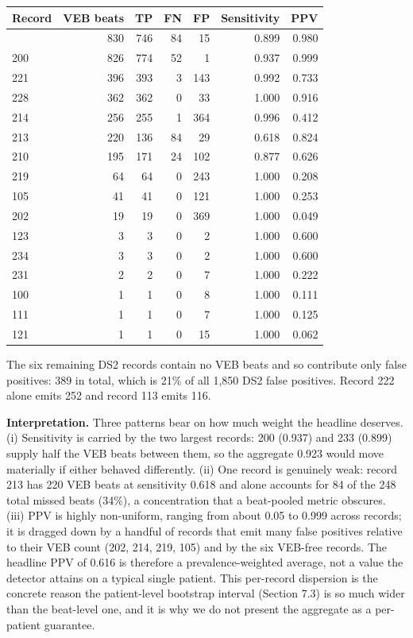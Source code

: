 \documentclass[
]{article}
\begin{document}
\begin{longtable}[]{@{}lrrrrrr@{}}
\toprule\noalign{}
Record & VEB beats & TP & FN & FP & Sensitivity & PPV \\
\midrule\noalign{}
\endhead
\bottomrule\noalign{}
\endlastfoot
233 & 830 & 746 & 84 & 15 & 0.899 & 0.980 \\
200 & 826 & 774 & 52 & 1 & 0.937 & 0.999 \\
221 & 396 & 393 & 3 & 143 & 0.992 & 0.733 \\
228 & 362 & 362 & 0 & 33 & 1.000 & 0.916 \\
214 & 256 & 255 & 1 & 364 & 0.996 & 0.412 \\
213 & 220 & 136 & 84 & 29 & 0.618 & 0.824 \\
210 & 195 & 171 & 24 & 102 & 0.877 & 0.626 \\
219 & 64 & 64 & 0 & 243 & 1.000 & 0.208 \\
105 & 41 & 41 & 0 & 121 & 1.000 & 0.253 \\
202 & 19 & 19 & 0 & 369 & 1.000 & 0.049 \\
123 & 3 & 3 & 0 & 2 & 1.000 & 0.600 \\
234 & 3 & 3 & 0 & 2 & 1.000 & 0.600 \\
231 & 2 & 2 & 0 & 7 & 1.000 & 0.222 \\
100 & 1 & 1 & 0 & 8 & 1.000 & 0.111 \\
111 & 1 & 1 & 0 & 7 & 1.000 & 0.125 \\
121 & 1 & 1 & 0 & 15 & 1.000 & 0.062 \\
\end{longtable}

The six remaining DS2 records contain no VEB beats and so contribute
only false positives: 389 in total, which is 21\% of all 1,850 DS2 false
positives. Record 222 alone emits 252 and record 113 emits 116.

\textbf{Interpretation.} Three patterns bear on how much weight the
headline deserves. (i) Sensitivity is carried by the two largest
records: 200 (0.937) and 233 (0.899) supply half the VEB beats between
them, so the aggregate 0.923 would move materially if either behaved
differently. (ii) One record is genuinely weak: record 213 has 220 VEB
beats at sensitivity 0.618 and alone accounts for 84 of the 248 total
missed beats (34\%), a concentration that a beat-pooled metric obscures.
(iii) PPV is highly non-uniform, ranging from about 0.05 to 0.999 across
records; it is dragged down by a handful of records that emit many false
positives relative to their VEB count (202, 214, 219, 105) and by the
six VEB-free records. The headline PPV of 0.616 is therefore a
prevalence-weighted average, not a value the detector attains on a
typical single patient. This per-record dispersion is the concrete
reason the patient-level bootstrap interval (Section 7.3) is so much
wider than the beat-level one, and it is why we do not present the
aggregate as a per-patient guarantee.
\end{document}
